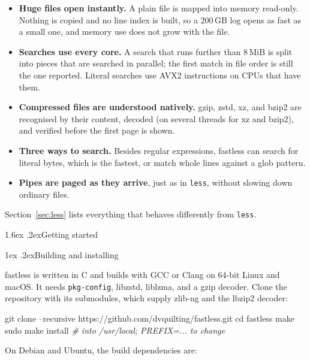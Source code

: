 \documentclass[11pt,a4paper]{article}
\makeatletter
\renewcommand\section{\@startsection{section}{1}{\z@}{-3.2ex \@plus -1ex \@minus -.2ex}%
  {1.6ex \@plus .2ex}{\sffamily\Large\bfseries\color{accent}}}
\renewcommand\subsection{\@startsection{subsection}{2}{\z@}{-2.6ex\@plus -1ex \@minus -.2ex}%
  {1ex \@plus .2ex}{\sffamily\large\bfseries\color{accent}}}
\newcommand{\cmd}[1]{\texttt{#1}}
\newcommand{\fl}{\textsf{\small\color{accent}fastless}}
\makeatother
\begin{document}
\begin{itemize}
\item \textbf{Huge files open instantly.} A plain file is mapped into memory
  read-only. Nothing is copied and no line index is built, so a 200\,GB log opens
  as fast as a small one, and memory use does not grow with the file.
\item \textbf{Searches use every core.} A search that runs further than 8\,MiB is
  split into pieces that are searched in parallel; the first match in file order
  is still the one reported. Literal searches use AVX2 instructions on CPUs that
  have them.
\item \textbf{Compressed files are understood natively.} gzip, zstd, xz, and
  bzip2 are recognised by their content, decoded (on several threads for xz and
  bzip2), and verified before the first page is shown.
\item \textbf{Three ways to search.} Besides regular expressions, \fl{} can
  search for literal bytes, which is the fastest, or match whole lines against a
  glob pattern.
\item \textbf{Pipes are paged as they arrive}, just as in \cmd{less}, without
  slowing down ordinary files.
\end{itemize}

Section~\ref{sec:less} lists everything that behaves differently from \cmd{less}.

\section{Getting started}

\subsection{Building and installing}

\fl{} is written in C and builds with GCC or Clang on 64-bit Linux and macOS. It
needs \cmd{pkg-config}, libzstd, liblzma, and a gzip decoder. Clone the
repository with its submodules, which supply zlib-ng and the lbzip2 decoder:

\begin{shell}
git clone --recursive https://github.com/dvquilting/fastless.git
cd fastless
make
sudo make install          \textit{# into /usr/local; PREFIX=... to change}
\end{shell}

On Debian and Ubuntu, the build dependencies are:
\end{document}

